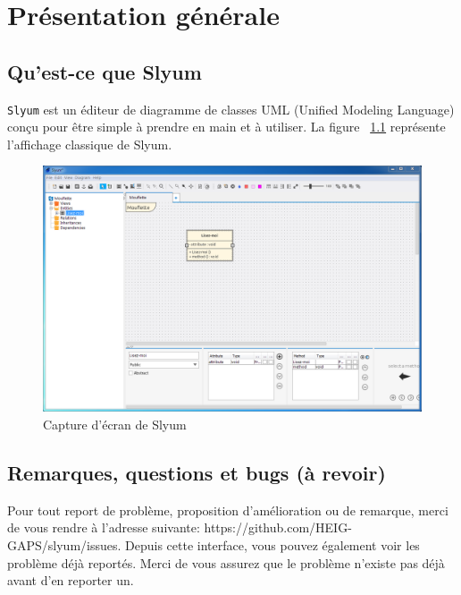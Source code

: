 \chapter{Présentation générale}

\section*{Qu'est-ce que Slyum}

\texttt{Slyum} est un éditeur de diagramme de classes UML (Unified Modeling Language) conçu pour être simple à prendre en main et à utiliser. La figure ~\ref{img:main_screen} représente l'affichage classique de Slyum.

\begin{figure}[h]
	\includegraphics[width=\textwidth]{images/slyum-window.png}
	\caption{Capture d'écran de Slyum}
	\label{img:main_screen}
\end{figure}

\section*{Remarques, questions et bugs (à revoir)}

Pour tout report de problème, proposition d'amélioration ou de remarque, merci de vous rendre à l'adresse suivante:
https://github.com/HEIG-GAPS/slyum/issues.
Depuis cette interface, vous pouvez également voir les problème déjà reportés. Merci de vous assurez que le problème n'existe pas déjà avant d'en reporter un.
